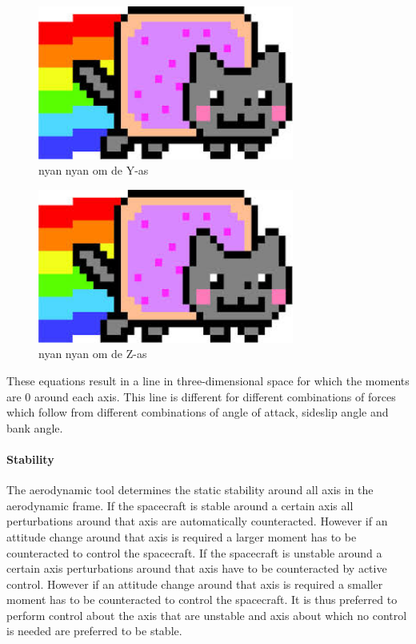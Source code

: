 \begin{figure}[h]
	\centering
	\includegraphics[width=0.75\textwidth]{./Figure/Nyan}
	\caption{nyan nyan om de Y-as}
	\label{fig:momy}
\end{figure}

\begin{figure}[h]
	\centering
	\includegraphics[width=0.75\textwidth]{./Figure/Nyan}
	\caption{nyan nyan om de Z-as}
	\label{fig:momz}
\end{figure}

These equations result in a line in three-dimensional space for which the moments are 0 around each axis. This line is different for different combinations of forces which follow from different combinations of angle of attack, sideslip angle and bank angle.

\paragraph{Stability}
\label{control:stab}
The aerodynamic tool determines the static stability around all axis in the aerodynamic frame. If the spacecraft is stable around a certain axis all perturbations around that axis are automatically counteracted. However if an attitude change around that axis is required a larger moment has to be counteracted to control the spacecraft.  If the spacecraft is unstable around a certain axis perturbations around that axis have to be counteracted by active control. However if an attitude change around that axis is required a smaller moment has to be counteracted to control the spacecraft. It is thus preferred to perform control about the axis that are unstable and axis about which no control is needed are preferred to be stable.

